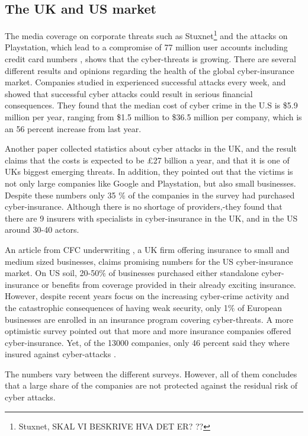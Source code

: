 \subsection{The UK and US market}
The media coverage on corporate threats such as Stuxnet\footnote{Stuxnet, SKAL VI BESKRIVE HVA DET ER? ?? } and the attacks on Playstation, which lead to a compromise of 77 million user accounts including credit card numbers \cite{playstation}, shows that the cyber-threats is growing. 
There are several different results and opinions regarding the health of the global cyber-insurance market. 
Companies studied in \cite{ccost} experienced successful attacks every week, and showed that successful cyber attacks could result in serious financial consequences. They found that the median cost of cyber crime in the U.S is \$5.9 million per year, 
 ranging from \$1.5 million to \$36.5 million per company, which is an 56 percent increase from last year. 
 
 Another paper \cite{evolvingcyber} collected statistics about cyber attacks in the UK, and the result claims that the costs is expected to be \pounds 27 billion a year, and that it is one of UKs biggest emerging threats. In addition, they pointed out that the victims is not only large companies like Google and Playstation, but also small businesses. Despite these numbers only 35 $\%$ of the companies in the survey had purchased cyber-insurance. Although there is no shortage of providers,-they found that there are 9 insurers with specialists in cyber-insurance in the UK, and in the US around 30-40 actors.  
 
 
 An article from CFC underwriting \cite{CFCunder}, a UK firm offering insurance to small 
and medium sized businesses, claims promising numbers for the US cyber-insurance market. 
On US soil, 20-50$\%$ of businesses purchased either standalone cyber-insurance or benefits from
 coverage provided in their already exciting insurance. However, despite recent years focus on the increasing
  cyber-crime activity and the catastrophic consequences of having weak security, 
  only 1$\%$ of European businesses are enrolled in an insurance program covering cyber-threats.
 A more optimistic survey pointed out that more and more insurance companies offered cyber-insurance. Yet, of the 13000 companies, only 46 percent said they where insured against cyber-attacks \cite{compworld}. 
 
 The numbers vary between the different surveys. However, all of them concludes that a large share of the companies are not protected against the residual risk of cyber attacks. 
    
